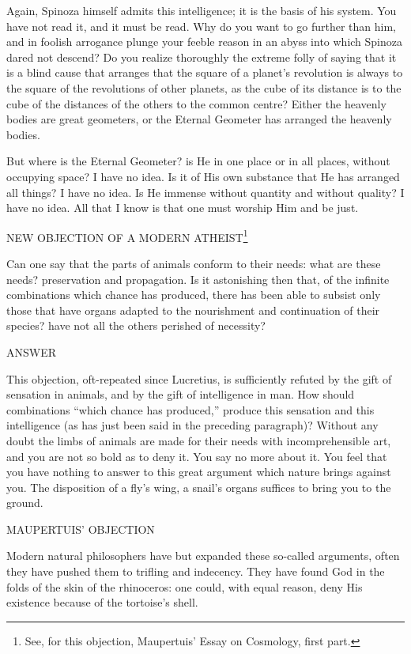 Again, Spinoza himself admits this intelligence; it is the basis of his
system. You have not read it, and it must be read. Why do you want to go
further than him, and in foolish arrogance plunge your feeble reason in
an abyss into which Spinoza dared not descend? Do you realize thoroughly
the extreme folly of saying that it is a blind cause that arranges that
the square of a planet's revolution is always to the square of the
revolutions of other planets, as the cube of its distance is to the cube
of the distances of the others to the common centre? Either the
heavenly bodies are great geometers, or the Eternal Geometer has
arranged the heavenly bodies.

But where is the Eternal Geometer? is He in one place or in all places,
without occupying space? I have no idea. Is it of His own substance that
He has arranged all things? I have no idea. Is He immense without
quantity and without quality? I have no idea. All that I know is that
one must worship Him and be just.

\noindent
NEW OBJECTION OF A MODERN ATHEIST\footnote{See, for this objection, Maupertuis' Essay on Cosmology, first part.}

Can one say that the parts of animals conform to their needs: what are
these needs? preservation and propagation. Is it astonishing then that,
of the infinite combinations which chance has produced, there has been
able to subsist only those that have organs adapted to the nourishment
and continuation of their species? have not all the others perished of
necessity?

\noindent
ANSWER

This objection, oft-repeated since Lucretius, is sufficiently refuted by
the gift of sensation in animals, and by the gift of intelligence in
man. How should combinations \enquote{which chance has produced,} produce this
sensation and this intelligence (as has just been said in the preceding
paragraph)? Without any doubt the limbs of animals are made for their
needs with incomprehensible art, and you are not so bold as to deny it.
You say no more about it. You feel that you have nothing to answer to
this great argument which nature brings against you. The disposition of
a fly's wing, a snail's organs suffices to bring you to the ground.

\noindent
MAUPERTUIS' OBJECTION

Modern natural philosophers have but expanded these so-called arguments,
often they have pushed them to trifling and indecency. They have found
God in the folds of the skin of the rhinoceros: one could, with equal
reason, deny His existence because of the tortoise's shell.

